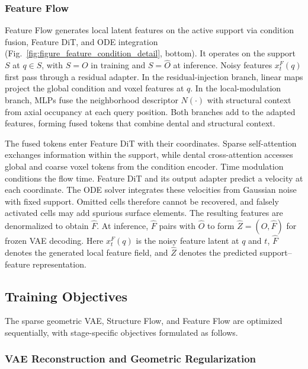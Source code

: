 \documentclass[preprint,review,12pt]{elsarticle}
\begin{document}
\subsubsection{Feature Flow}\label{subsec3_4_2}

\hspace{2em}Feature Flow generates local latent features on the active support via condition fusion, Feature DiT, and ODE integration (Fig.~\ref{fig:figure_feature_condition_detail}, bottom). It operates on the support \(S\) at \(q\in S\), with \(S=O\) in training and \(S=\hat{O}\) at inference. Noisy features \(x_t^F(q)\) first pass through a residual adapter. In the residual-injection branch, linear maps project the global condition and voxel features at \(q\). In the local-modulation branch, MLPs fuse the neighborhood descriptor \(N(\cdot)\) with structural context from axial occupancy at each query position. Both branches add to the adapted features, forming fused tokens that combine dental and structural context.

\hspace{2em}The fused tokens enter Feature DiT with their coordinates. Sparse self-attention exchanges information within the support, while dental cross-attention accesses global and coarse voxel tokens from the condition encoder. Time modulation conditions the flow time. Feature DiT and its output adapter predict a velocity at each coordinate. The ODE solver integrates these velocities from Gaussian noise with fixed support. Omitted cells therefore cannot be recovered, and falsely activated cells may add spurious surface elements. The resulting features are denormalized to obtain \(\hat F\). At inference, $\hat F$ pairs with $\hat O$ to form $\hat Z=(\hat O,\hat F)$ for frozen VAE decoding. Here $x_t^F(q)$ is the noisy feature latent at $q$ and $t$, $\hat F$ denotes the generated local feature field, and $\hat Z$ denotes the predicted support--feature representation.


\subsection{Training Objectives}\label{subsec3_5}

\hspace{2em}The sparse geometric VAE, Structure Flow, and Feature Flow are optimized sequentially, with stage-specific objectives formulated as follows.

\subsubsection{VAE Reconstruction and Geometric Regularization}\label{subsubsec3_5_1}
\end{document}
